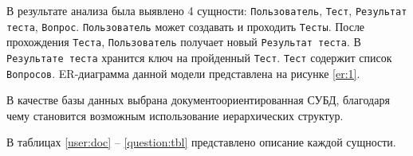 В результате анализа была выявлено 4 сущности: \texttt{Пользователь}, \texttt{Тест}, \texttt{Результат теста}, \texttt{Вопрос}.
\texttt{Пользователь} может создавать и проходить \texttt{Тесты}. После прохождения \texttt{Теста}, \texttt{Пользователь} получает новый \texttt{Результат теста}. В \texttt{Результате теста} хранится ключ на пройденный \texttt{Тест}. \texttt{Тест} содержит список \texttt{Вопросов}. ER-диаграмма данной модели представлена на рисунке \ref{er:1}.
\begin{figure}[ht!]
\end{figure}

В качестве базы данных выбрана документоориентированная СУБД, благодаря чему становится возможным использование иерархических структур.

В таблицах \ref{user:doc} -- \ref{question:tbl} представлено описание каждой сущности.

